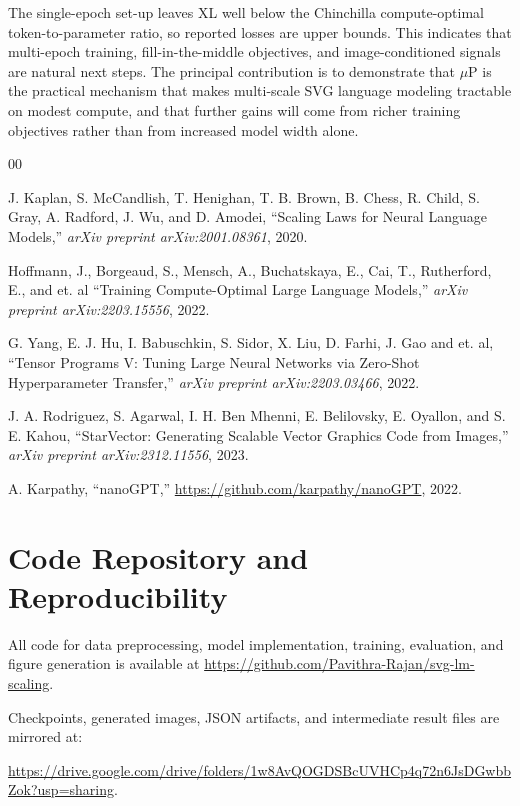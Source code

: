 \documentclass[a4paper]{article}
\begin{document}
The single-epoch set-up leaves XL well below the Chinchilla compute-optimal token-to-parameter ratio, so reported losses are upper bounds. This indicates that multi-epoch training, fill-in-the-middle objectives, and image-conditioned signals are natural next steps. The principal contribution is to demonstrate that $\mu$P is the practical mechanism that makes multi-scale SVG language modeling tractable on modest compute, and that further gains will come from richer training objectives rather than from increased model width alone.

\begin{thebibliography}{00}

 J. Kaplan, S. McCandlish, T. Henighan, T. B. Brown, B. Chess, R. Child, S. Gray, A. Radford, J. Wu, and D. Amodei, ``Scaling Laws for Neural Language Models,'' \textit{arXiv preprint arXiv:2001.08361}, 2020.

 Hoffmann, J., Borgeaud, S., Mensch, A., Buchatskaya, E., Cai, T., Rutherford, E., and et. al ``Training Compute-Optimal Large Language Models,'' \textit{arXiv preprint arXiv:2203.15556}, 2022.


 G. Yang, E. J. Hu, I. Babuschkin, S. Sidor, X. Liu, D. Farhi, J. Gao and et. al, ``Tensor Programs V: Tuning Large Neural Networks via Zero-Shot Hyperparameter Transfer,'' \textit{arXiv preprint arXiv:2203.03466}, 2022.

 J. A. Rodriguez, S. Agarwal, I. H. Ben Mhenni, E. Belilovsky, E. Oyallon, and S. E. Kahou, ``StarVector: Generating Scalable Vector Graphics Code from Images,'' \textit{arXiv preprint arXiv:2312.11556}, 2023.

 A. Karpathy, ``nanoGPT,'' \url{https://github.com/karpathy/nanoGPT}, 2022.

\end{thebibliography}


\section*{Code Repository and Reproducibility}

All code for data preprocessing, model implementation, training, evaluation, and figure generation is available at \url{https://github.com/Pavithra-Rajan/svg-lm-scaling}. 

Checkpoints, generated images, JSON artifacts, and intermediate result files are mirrored at:

\url{https://drive.google.com/drive/folders/1w8AvQOGDSBcUVHCp4q72n6JsDGwbbZok?usp=sharing}.
\end{document}
